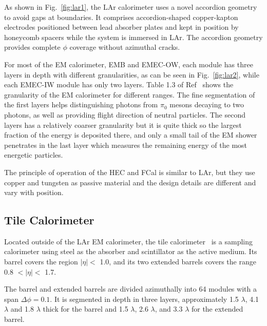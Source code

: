 \par As shown in Fig.~\ref{fig:lar1}, the LAr calorimeter uses a novel accordion geometry to avoid gaps at boundaries. It comprises accordion-shaped copper-kapton electrodes positioned between lead absorber plates and kept in position by honeycomb spacers while the system is immersed in LAr. The accordion geometry provides complete $\phi$ coverage without azimuthal cracks.

\par For most of the EM calorimeter, EMB and EMEC-OW, each module has three layers in depth with different granularities, 
as can be seen in Fig.~\ref{fig:lar2}, while each EMEC-IW module has only two layers. Table 1.3 of Ref~\cite{Aad:1129811} 
shows the granularity of the EM calorimeter for different ranges. The fine segmentation of the first layers helps distinguishing photons from $\pi_0$ mesons decaying to two photons, as well as providing flight direction of neutral particles. The second layers has a relatively coarser granularity but it is quite thick so the largest fraction of the energy is deposited there, and only a small tail of the EM shower penetrates in the last layer which measures the remaining energy of the most energetic particles.

\par The principle of operation of the HEC and FCal is similar to LAr, but they use copper and tungsten as passive material and the design details are different and vary with position.

\subsection{Tile Calorimeter}

\par Located outside of the LAr EM calorimeter, the tile calorimeter~\cite{CERN-LHCC-96-042} is a sampling calorimeter using steel as the absorber and scintillator as the active medium. Its barrel covers the region $|\eta| <$ 1.0, and its two extended barrels covers the range 0.8 $< |\eta| <$ 1.7.

\par The barrel and extended barrels are divided azimuthally into 64 modules with a span $\Delta \phi = 0.1$. It is segmented in depth in three layers, approximately 1.5 $\lambda$, 4.1 $\lambda$ and 1.8 $\lambda$ thick for the barrel and 1.5 $\lambda$, 2.6 $\lambda$, and 3.3 $\lambda$ for the extended barrel.

